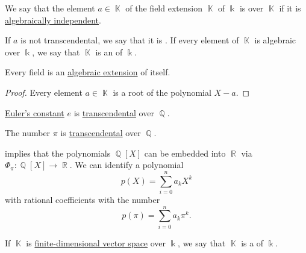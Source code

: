 \begin{definition}\label{def:transcendental_element}
  We say that the element \( a \in \BbbK \) of the field extension \( \BbbK \) of \( \Bbbk \) is  over \( \BbbK \) if it is \hyperref[def:algebraic_dependence]{algebraically independent}.

  If \( a \) is not transcendental, we say that it is . If every element of \( \BbbK \) is algebraic over \( \Bbbk \), we say that \( \BbbK \) is an  of \( \Bbbk \).
\end{definition}

\begin{proposition}\label{thm:field_is_algebraic_over_itself}
  Every field is an \hyperref[def:transcendental_element]{algebraic extension} of itself.
\end{proposition}
\begin{proof}
  Every element \( a \in \BbbK \) is a root of the polynomial \( X - a \).
\end{proof}

\begin{theorem}\label{thm:eulers_constant_is_transcendental}
  \hyperref[def:exponential_function]{Euler's constant} \( e \) is \hyperref[def:transcendental_element]{transcendental} over \( \BbbQ \).
\end{theorem}

\begin{theorem}[Pi is transcendental]\label{thm:pi_is_transcendental}
  The number \hyperref[def:pi]{\( \pi \)} is \hyperref[def:transcendental_element]{transcendental} over \( \BbbQ \).
\end{theorem}

\begin{example}\label{ex:polynomials_over_pi}
   implies that the polynomials \( \BbbQ[X] \) can be embedded into \( \BbbR \) via \( \Phi_\pi: \BbbQ[X] \to \BbbR \). We can identify a polynomial
  \begin{equation*}
    p(X) = \sum_{i=0}^n a_k X^k
  \end{equation*}
  with rational coefficients with the number
  \begin{equation*}
    p(\pi) = \sum_{i=0}^n a_k \pi^k.
  \end{equation*}
\end{example}

\begin{definition}\label{def:finite_field_extension}
  If \( \BbbK \) is \hyperref[thm:vector_space_dimension]{finite-dimensional vector space} over \( \Bbbk \), we say that \( \BbbK \) is a  of \( \Bbbk \).
\end{definition}

